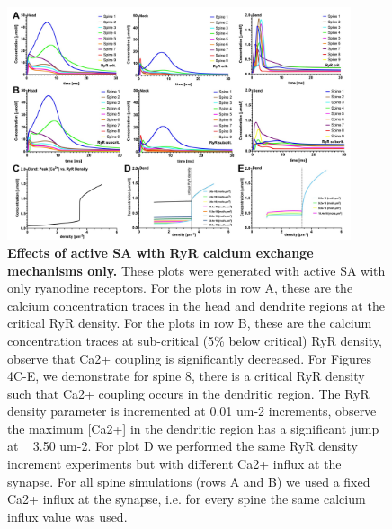 \documentclass[fleqn,12pt]{wlscirep}
\begin{document}
\begin{figure}[h!]
\centering
\includegraphics[width=0.9\textwidth]{images/figure4.jpg}
\caption{{\small\textbf{Effects of active SA with RyR calcium exchange mechanisms only.} These plots were generated with active SA with only ryanodine receptors. For the plots in row A, these are the calcium concentration traces in the head and dendrite regions at the critical RyR density. For the plots in row B, these are the calcium concentration traces at sub-critical (5\% below critical) RyR density, observe that Ca2+ coupling is significantly decreased. For Figures 4C-E, we demonstrate for spine 8, there is a critical RyR density  such that Ca2+ coupling occurs in the dendritic region. The RyR density parameter is incremented at 0.01 um-2 increments, observe the maximum [Ca2+] in the dendritic region has a significant jump at ~ 3.50 um-2. For plot D we performed the same RyR density increment experiments but with different Ca2+ influx at the synapse. For all spine simulations (rows A and B) we used a fixed Ca2+ influx at the synapse, i.e. for every spine the same calcium influx value was used.}}
\end{figure}
\end{document}
